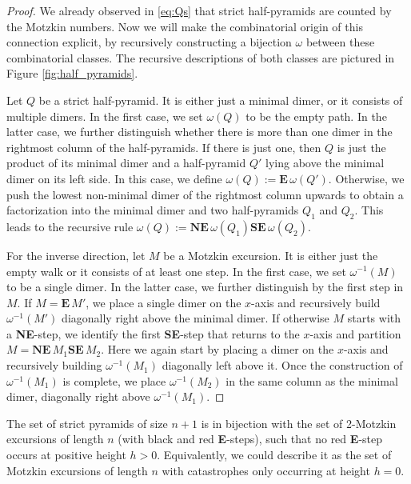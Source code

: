 \begin{proof}
  We already observed in \eqref{eq:Qs} that strict half-pyramids are counted by the Motzkin numbers. Now we will make the combinatorial origin of this connection explicit, by recursively constructing a bijection $\omega$ between these combinatorial classes. The recursive descriptions of both classes are pictured in Figure \ref{fig:half_pyramids}.

  Let $Q$ be a strict half-pyramid. It is either just a minimal dimer, or it consists of multiple dimers. In the first case, we set $\omega(Q)$ to be the empty path. 
  In the latter case, we further distinguish whether there is more than one dimer in the rightmost column of the half-pyramids. If there is just one, then $Q$ is just the product of its minimal dimer and a half-pyramid $Q'$ lying above the minimal dimer on its left side. In this case, we define $\omega(Q) := \textbf{E}\, \omega(Q')$.
  Otherwise, we push the lowest non-minimal dimer of the rightmost column upwards to obtain a factorization into the minimal dimer and two half-pyramids $Q_1$ and $Q_2$. This leads to the recursive rule $\omega(Q):= \textbf{NE}\,\omega(Q_1) \textbf{SE}\, \omega(Q_2)$.
  
  For the inverse direction, let $M$ be a Motzkin excursion. It is either just the empty walk or it consists of at least one step. In the first case, we set $\omega^{-1}(M)$ to be a single dimer.
  In the latter case, we further distinguish by the first step in $M$.
  If $M = \textbf{E}\, M'$, we place a single dimer on the $x$-axis and recursively build $\omega^{-1}(M')$ diagonally right above the minimal dimer.
  If otherwise $M$ starts with a \textbf{NE}-step, we identify the first \textbf{SE}-step that returns to the $x$-axis and partition $M = \textbf{NE}\, M_1 \textbf{SE}\, M_2$. Here we again start by placing a dimer on the $x$-axis and recursively building $\omega^{-1}(M_1)$ diagonally left above it. Once the construction of $\omega^{-1}(M_1)$ is complete, we place $\omega^{-1}(M_2)$ in the same column as the minimal dimer, diagonally right above $\omega^{-1}(M_1)$.
\end{proof}

\begin{lemma}\label{lemma:pyramids}
  The set of strict pyramids of size $n+1$ is in bijection with the set of 2-Motzkin excursions of length $n$ (with black and red \textbf{E}-steps), such that no red {\color{catred}\textbf{E}}-step occurs at positive height $h > 0$.
  Equivalently, we could describe it as the set of Motzkin excursions of length $n$ with catastrophes only occurring at height $h = 0$.
\end{lemma}

